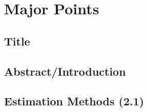 \documentclass[12pt,english]{scrartcl}
\begin{document}
\section{Major Points}
\subsection{Title}
% 
% 
\subsection{Abstract/Introduction}
% 
%
\subsection{Estimation Methods (2.1)}
% 
% 
% 
%
\end{document}
